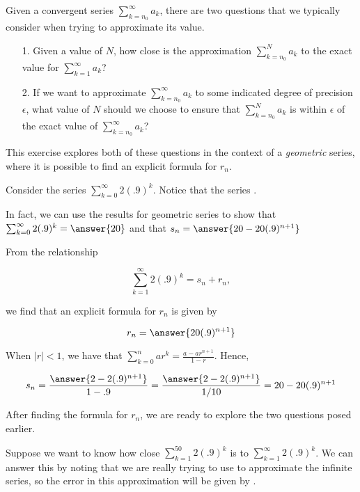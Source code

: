 \documentclass{ximera}
\author{Jim Talamo}
\begin{document}
\begin{exercise}

Given a convergent series $\sum_{k=n_0}^{\infty} a_k$, there are two questions that we typically consider when trying to approximate its value.

\begin{itemize}
\item[1.] Given a value of $N$, how close is the approximation $\sum_{k=n_0}^N a_k$ to the exact value for $\sum_{k=1}^{\infty} a_k$?
\item[2.] If we want to approximate $\sum_{k=n_0}^{\infty} a_k$ to some indicated degree of precision $\epsilon$, what value of $N$ should we choose to ensure that $\sum_{k=n_0}^N a_k$ is within $\epsilon$ of the exact value of $\sum_{k=n_0}^{\infty} a_k$?
\end{itemize}

This exercise explores both of these questions in the context of a \emph{geometric} series, where it is possible to find an explicit formula for $r_n$.

Consider the series $\sum_{k=0}^{\infty} 2(.9)^k$.  Notice that the series .

\begin{exercise}
In fact, we can use the results for geometric series to show that  $\sum_{k=0}^{\infty} 2(.9)^k = \answer{20}$ and that $s_n = \answer{20-20(.9)^{n+1}}$

From the relationship 

\[
\sum_{k=1}^{\infty} 2(.9)^k = s_n+r_n,
\]

we find that an explicit formula for $r_n$ is given by

\[
r_n = \answer{20(.9)^{n+1}}
\]

\begin{hint}
When $|r|<1$, we have that $\sum_{k=0}^n ar^k = \frac{a-ar^{n+1}}{1-r}$.  Hence,

\[
s_n = \frac{\answer{2-2(.9)^{n+1}}}{1-.9} = \frac{\answer{2-2(.9)^{n+1}}}{1/10} = 20-20(.9)^{n+1}
\]
\end{hint}

After finding the formula for $r_n$, we are ready to explore the two questions posed earlier.

\begin{exercise}
Suppose we want to know how close $\sum_{k=1}^{50} 2(.9)^k $ is to $\sum_{k=1}^{\infty} 2(.9)^k$. We can answer this by noting that we are really trying to use  to approximate the infinite series, so the error in this approximation will be given by .


\end{exercise}
\end{exercise}
\end{exercise}
\end{document}
